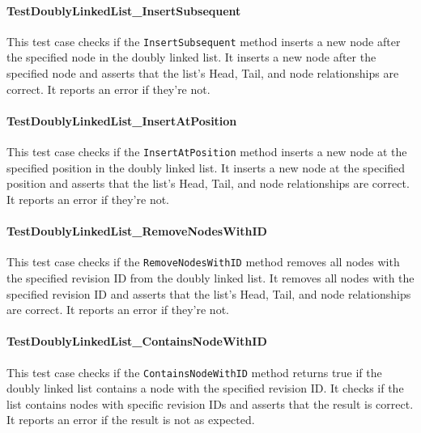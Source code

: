 \paragraph{TestDoublyLinkedList\_InsertSubsequent}
This test case checks if the \lstinline{InsertSubsequent} method inserts a new node after the specified node in the doubly linked list. It inserts a new node after the specified node and asserts that the list's Head, Tail, and node relationships are correct. It reports an error if they're not.

\paragraph{TestDoublyLinkedList\_InsertAtPosition}
This test case checks if the \lstinline{InsertAtPosition} method inserts a new node at the specified position in the doubly linked list. It inserts a new node at the specified position and asserts that the list's Head, Tail, and node relationships are correct. It reports an error if they're not.

\paragraph{TestDoublyLinkedList\_RemoveNodesWithID}
This test case checks if the \lstinline{RemoveNodesWithID} method removes all nodes with the specified revision ID from the doubly linked list. It removes all nodes with the specified revision ID and asserts that the list's Head, Tail, and node relationships are correct. It reports an error if they're not.

\paragraph{TestDoublyLinkedList\_ContainsNodeWithID}
This test case checks if the \lstinline{ContainsNodeWithID} method returns true if the doubly linked list contains a node with the specified revision ID. It checks if the list contains nodes with specific revision IDs and asserts that the result is correct. It reports an error if the result is not as expected.

